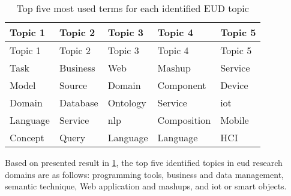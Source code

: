 \hypertarget{tbl:edu-topics}{}
\begin{longtable}{@{}lllll@{}}
\caption{\label{tbl:edu-topics}Top five most used terms for each identified EUD topic}\tabularnewline
\toprule
\begin{minipage}[b]{0.18\columnwidth}\raggedright
Topic 1\strut
\end{minipage} & 
\begin{minipage}[b]{0.18\columnwidth}\raggedright
Topic 2\strut
\end{minipage} & 
\begin{minipage}[b]{0.18\columnwidth}\raggedright
Topic 3\strut
\end{minipage} & 
\begin{minipage}[b]{0.22\columnwidth}\raggedright
Topic 4\strut
\end{minipage} & 
\begin{minipage}[b]{0.18\columnwidth}\raggedright
Topic 5\strut
\end{minipage} \tabularnewline
\midrule
\endfirsthead

\toprule
\begin{minipage}[b]{0.18\columnwidth}\raggedright
Topic 1\strut
\end{minipage} & 
\begin{minipage}[b]{0.18\columnwidth}\raggedright
Topic 2\strut
\end{minipage} & 
\begin{minipage}[b]{0.18\columnwidth}\raggedright
Topic 3\strut
\end{minipage} & 
\begin{minipage}[b]{0.22\columnwidth}\raggedright
Topic 4\strut
\end{minipage} & 
\begin{minipage}[b]{0.18\columnwidth}\raggedright
Topic 5\strut
\end{minipage} \tabularnewline
\midrule
\endhead

Task & Business & Web & Mashup & Service \tabularnewline
Model & Source & Domain & Component & Device \tabularnewline
Domain & Database & Ontology & Service & \gls{iot} \tabularnewline
Language & Service & \gls{nlp} & Composition & Mobile \tabularnewline
Concept & Query & Language & Language & HCI \tabularnewline

\bottomrule
\end{longtable}

Based on presented result in \cref{tbl:edu-topics}, the top five identified topics in \gls{eud} research domains are as follows: programming tools, business and data management, semantic technique, Web application and mashups, and \gls{iot} or smart objects. 

